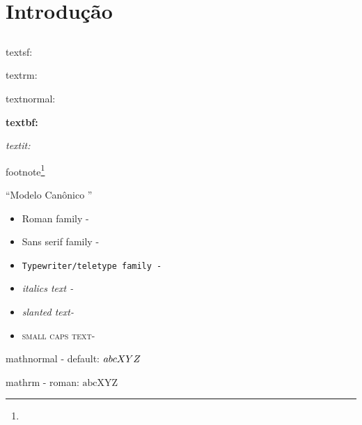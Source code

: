 


\chapter[Introdução]{Introdução \showfont}
\showfont
\section[Some encoding tests]{\showfont}
\subsection{\showfont}
\subsubsection{\showfont}
\subsubsubsection{\showfont}


\textsf{textsf: \showfont} 

\textrm{textrm: \showfont}

\textnormal{textnormal: \showfont}

\textbf{textbf: \showfont} 

\textit{textit: \showfont}

footnote\footnote{\showfont}


``Modelo Canônico \showfont''

\begin{itemize}
\item \textrm{Roman family - \showfont }
\item \textsf{Sans serif family - \showfont}
\item \texttt{Typewriter/teletype family - \showfont}
\item \textit{italics text - \showfont}
\item \textsl{slanted text- \showfont}
\item \textsc{small caps text- \showfont}	
\end{itemize}




mathnormal -  default: $\mathnormal{abcXYZ}$

mathrm - roman: $\mathrm{abcXYZ}$

